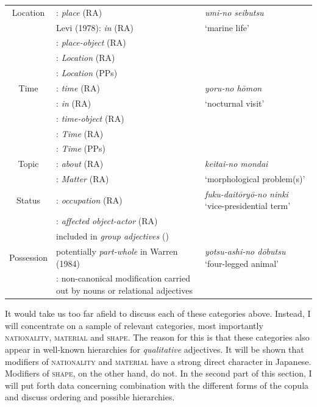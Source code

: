 \documentclass [output=book,colorlinks,citecolor=brown]{langscibook}
\begin{document}
\begin{center}
\begin{longtable}{|c|p{8cm}|p{3cm}|}
\hline
Location & \citet{downing:1977:creation}: \textit{place} (RA) & \textit{umi-no seibutsu}\\
& Levi (1978): \textit{in} (RA) & `marine life'\\
& \citet{warren:1984:classifying}: \textit{place-object} (RA) & \\
& \citet{rae:2010:ordering, bortolotto:2016:RA}: \textit{Location} (RA) & \\
& \citet{takamine:2010:hierarchy}: \textit{Location} (PPs) & \\
\hline
Time & \citet{downing:1977:creation}: \textit{time} (RA) & \textit{yoru-no hōmon}\\
& \citet{levi:1978:syntax}: \textit{in} (RA) & `nocturnal visit'\\
& \citet{warren:1984:classifying}: \textit{time-object} (RA) & \\
& \citet{rae:2010:ordering, bortolotto:2016:RA}: \textit{Time} (RA) & \\
& \citet{takamine:2010:hierarchy}: \textit{Time} (PPs) & \\
\hline
Topic & \citet{levi:1978:syntax}: \textit{about} (RA) & \textit{keitai-no mondai}\\
& \citet{rae:2010:ordering, bortolotto:2016:RA}: \textit{Matter} (RA) & `morphological problem(s)' \\
\hline
Status & \citet{downing:1977:creation}: \textit{occupation} (RA) & \textit{fuku-daitōryō-no ninki} `vice-presidential term'\\
& \citet{warren:1984:classifying}: \textit{affected object-actor} (RA) & \\
& included in \textit{group adjectives} (\citealt{grimshaw:1991:argument, cetnarowska:2015:categorial}) & \\
\hline
Possession & potentially \textit{part-whole} in Warren (1984) & \textit{yotsu-ashi-no dōbutsu} `four-legged animal'\\
& \citet{nikolaeva:2012:possession, nikolaeva:2020:mixed, spencer:2017:denominal}: non-canonical modification carried out by nouns or relational adjectives & \\
\end{longtable}
\end{center}


It would take us too far afield to discuss each of these categories above. Instead, I will concentrate on a sample of relevant categories, most importantly \textsc{nationality}, \textsc{material} and \textsc{shape}. The reason for this is that these categories also appear in well-known hierarchies for \textit{qualitative} adjectives. It will be shown that modifiers of \textsc{nationality} and \textsc{material} have a strong direct character in Japanese. Modifiers of \textsc{shape}, on the other hand, do not. In the second part of this section, I will put forth data concerning combination with the different forms of the copula and discuss ordering and possible hierarchies.
\end{document}
